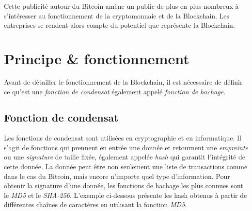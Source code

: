 \documentclass{article}
\begin{document}
Cette publicité autour du Bitcoin amène un public de plus en plus nombreux à s'intéresser au fonctionnement de la cryptomonnaie et de la Blockchain. Les entreprises se rendent alors compte du potentiel que représente la Blockchain.


\section{Principe \& fonctionnement}

Avant de détailler le fonctionnement de la Blockchain, il est nécessaire de définir ce qu'est une \textit{fonction de condensat} également appelé \textit{fonction de hachage}.

\subsection{Fonction de condensat}

Les fonctions de condensat sont utilisées en cryptographie et en informatique. Il s'agit de fonctions qui prennent en entrée une donnée et retournent une \textit{empreinte} ou une \textit{signature} de taille fixée, également appelée \textit{hash} qui garantit l'intégrité de cette donnée. La donnée peut être non seulement une liste de transactions comme dans le cas du Bitcoin, mais encore n'importe quel type d'information. Pour obtenir la signature d'une donnée, les fonctions de hachage les plus connues sont le \textit{MD5} et le \textit{SHA-256}. L'exemple ci-dessous présente les hash obtenus à partir de différentes chaînes de caractères en utilisant la fonction \textit{MD5}.
\end{document}
